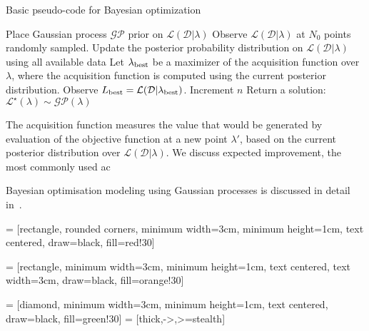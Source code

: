 \documentclass[twocolumn]{aastex631}
\newcommand{\Lmain}{\ensuremath{\mathcal{L}(\mathcal{D}|\lambda)}\xspace}
\newcommand{\Lsurr}{\ensuremath{\mathcal{L}^{\star}(\lambda)}\xspace}
\begin{document}
\begin{algorithm}
\caption{Basic pseudo-code for Bayesian optimization}
\label{alg:BayesOpt}
\begin{algorithmic}[1] %
    \STATE Place Gaussian process $\mathcal{GP}$ prior on $\Lmain$
    \STATE Observe $\Lmain$ at $N_0$ points randomly sampled.
        \STATE Update the posterior probability distribution on $\Lmain$ using all available data
        \STATE Let $\lambda_{\rm best}$ be a maximizer of the acquisition function over $\lambda$, where the acquisition function is computed using the current posterior distribution.
        \STATE Observe $L_{\rm best} = \mathcal{L}(\mathcal{D}|\lambda_{\rm best})$.
        \STATE Increment $n$
    \ENDWHILE
    \STATE Return a solution: $\Lsurr \sim \mathcal{GP}(\lambda)$
\end{algorithmic}
\end{algorithm}


The acquisition function measures the value that would be generated by
evaluation of the objective function at a new point $\lambda'$, based on the current posterior distribution over \Lmain. We discuss expected improvement, the most commonly used ac

Bayesian optimisation modeling using Gaussian processes is discussed in detail in~\cite{}.

 = [rectangle, rounded corners,
minimum width=3cm,
minimum height=1cm,
text centered,
draw=black,
fill=red!30]


 = [rectangle,
minimum width=3cm,
minimum height=1cm,
text centered,
text width=3cm,
draw=black,
fill=orange!30]

 = [diamond,
minimum width=3cm,
minimum height=1cm,
text centered,
draw=black,
fill=green!30]
 = [thick,->,>=stealth]

\end{document}
